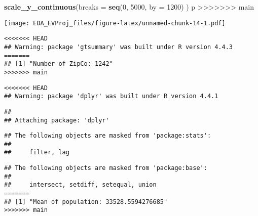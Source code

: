 \documentclass[
]{article}
\newenvironment{Shaded}{\begin{snugshade}}{\end{snugshade}}
\newcommand{\AttributeTok}[1]{\textcolor[rgb]{0.13,0.29,0.53}{#1}}
\newcommand{\DecValTok}[1]{\textcolor[rgb]{0.00,0.00,0.81}{#1}}
\newcommand{\FunctionTok}[1]{\textcolor[rgb]{0.13,0.29,0.53}{\textbf{#1}}}
\newcommand{\NormalTok}[1]{#1}
\newcommand{\SpecialCharTok}[1]{\textcolor[rgb]{0.81,0.36,0.00}{\textbf{#1}}}
\newcommand{\StringTok}[1]{\textcolor[rgb]{0.31,0.60,0.02}{#1}}
\begin{document}
\begin{Shaded}
\begin{Highlighting}[]
  \FunctionTok{scale\_y\_continuous}\NormalTok{(}\AttributeTok{breaks =} \FunctionTok{seq}\NormalTok{(}\DecValTok{0}\NormalTok{, }\DecValTok{5000}\NormalTok{, }\AttributeTok{by =} \DecValTok{1200}\NormalTok{) }
\NormalTok{)}
\NormalTok{p}
>>>>>>> main
\end{Highlighting}
\end{Shaded}

\texttt{[image: EDA\_EVProj\_files/figure-latex/unnamed-chunk-14-1.pdf]}

\begin{Shaded}
\end{Shaded}

\begin{verbatim}
<<<<<<< HEAD
## Warning: package 'gtsummary' was built under R version 4.4.3
=======
## [1] "Number of ZipCo: 1242"
>>>>>>> main
\end{verbatim}

\begin{Shaded}
\end{Shaded}

\begin{verbatim}
<<<<<<< HEAD
## Warning: package 'dplyr' was built under R version 4.4.1
\end{verbatim}

\begin{verbatim}
## 
## Attaching package: 'dplyr'
\end{verbatim}

\begin{verbatim}
## The following objects are masked from 'package:stats':
## 
##     filter, lag
\end{verbatim}

\begin{verbatim}
## The following objects are masked from 'package:base':
## 
##     intersect, setdiff, setequal, union
=======
## [1] "Mean of population: 33528.5594276685"
>>>>>>> main
\end{verbatim}
\end{document}
